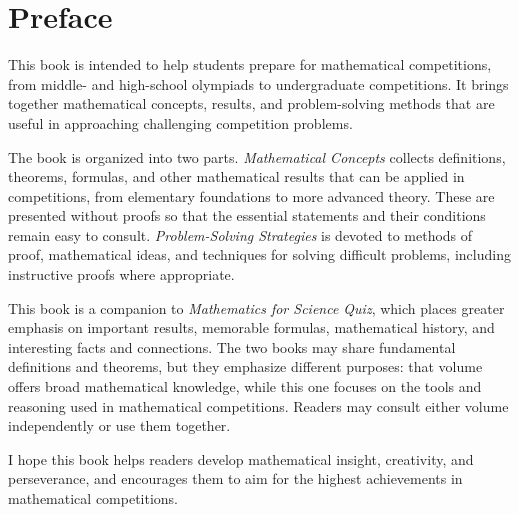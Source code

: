 \chapter*{Preface}

This book is intended to help students prepare for mathematical competitions,
from middle- and high-school olympiads to undergraduate competitions. It
brings together mathematical concepts, results, and problem-solving methods
that are useful in approaching challenging competition problems.

The book is organized into two parts. \emph{Mathematical Concepts} collects
definitions, theorems, formulas, and other mathematical results that can be
applied in competitions, from elementary foundations to more advanced theory.
These are presented without proofs so that the essential statements and their
conditions remain easy to consult. \emph{Problem-Solving Strategies} is devoted
to methods of proof, mathematical ideas, and techniques for solving difficult
problems, including instructive proofs where appropriate.

This book is a companion to \emph{Mathematics for Science Quiz}, which places
greater emphasis on important results, memorable formulas, mathematical
history, and interesting facts and connections. The two books may share
fundamental definitions and theorems, but they emphasize different purposes:
that volume offers broad mathematical knowledge, while this one focuses on
the tools and reasoning used in mathematical competitions. Readers may consult
either volume independently or use them together.

I hope this book helps readers develop mathematical insight, creativity,
and perseverance, and encourages them to aim for the highest achievements
in mathematical competitions.
